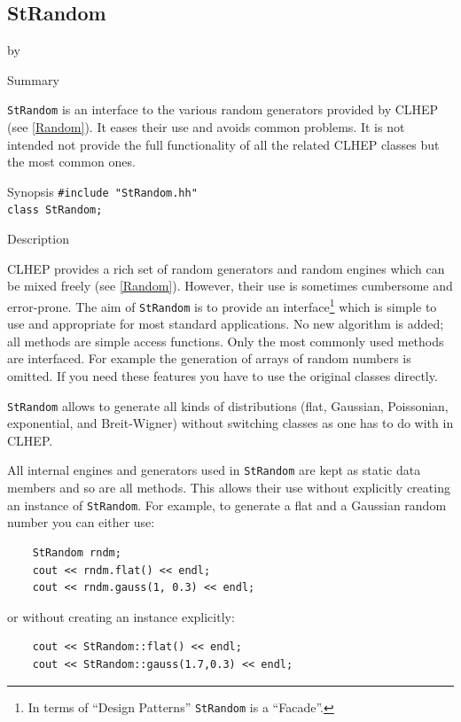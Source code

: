 \documentclass[twoside]{article}
\newcommand{\entrylabel}[1]{\mbox{\textbf{{#1}}}\hfil}%
\newenvironment{entry}
{\begin{list}{}%
    {\renewcommand{\makelabel}{\entrylabel}%
     \setlength{\labelwidth}{90pt}%
     \setlength{\leftmargin}{\labelwidth}
     \advance\leftmargin by \labelsep%
      }%
    }%
  {\end{list}}
\newcommand{\Entrylabel}[1]%
{\raisebox{0pt}[1ex][0pt]{\makebox[\labelwidth][l]%
    {\parbox[t]{\labelwidth}{\hspace{0pt}\textbf{{#1}}}}}}
\newenvironment{Entry}%
{\renewcommand{\entrylabel}{\Entrylabel}\begin{entry}}%
  {\end{entry}}
\begin{document}
\subsection{StRandom } \label{StRandom}
\begin{Entry}
    
\item[Summary]
    
    \texttt{StRandom} is an interface to the various random generators
    provided by CLHEP (see \ref{Random}).  It eases their use and
    avoids common problems. It is not intended not provide the full
    functionality of all the related CLHEP classes but the most common
    ones.
    
\item[Synopsis]
    \verb+#include "StRandom.hh"+\\
    \verb+class StRandom;+    
    
\item[Description]   
    
    CLHEP provides a rich set of random generators and random engines
    which can be mixed freely (see \ref{Random}). However, their use
    is sometimes cumbersome and error-prone. The aim of
    \texttt{StRandom} is to provide an interface\footnote{In terms of
        ``Design Patterns'' \texttt{StRandom} is a ``Facade''.} which
    is simple to use and appropriate for most standard applications.
    No new algorithm is added; all methods are simple access
    functions. Only the most commonly used methods are interfaced. For
    example the generation of arrays of random numbers is omitted. If
    you need these features you have to use the original classes
    directly.
    
    \texttt{StRandom} allows to generate all kinds of distributions
    (flat, Gaussian, Poissonian, exponential, and Breit-Wigner)
    without switching classes as one has to do with in CLHEP.
    
    All internal engines and generators used in \texttt{StRandom} are
    kept as static data members and so are all methods. This allows
    their use without explicitly creating an instance of
    \texttt{StRandom}.  For example, to generate a flat and a Gaussian
    random number you can either use:
\begin{verbatim}
    StRandom rndm;
    cout << rndm.flat() << endl;
    cout << rndm.gauss(1, 0.3) << endl;
\end{verbatim}
    or without creating an instance explicitly:
\begin{verbatim}
    cout << StRandom::flat() << endl;
    cout << StRandom::gauss(1.7,0.3) << endl;
\end{verbatim}
    

\end{Entry}
\end{document}
